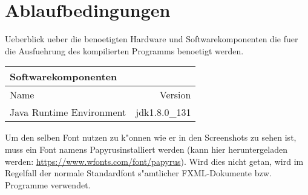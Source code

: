 \section{Ablaufbedingungen}
Ueberblick ueber die benoetigten Hardware und Softwarekomponenten die fuer die Ausfuehrung des kompilierten Programms benoetigt werden. 

\begin{table}[h!]
	\begin{tabular}{lr} 
	\toprule
	Softwarekomponenten\\  
	\midrule 
	Name & Version\\ 
	\midrule 
	Java Runtime Environment & jdk1.8.0\_131\\ 
	\bottomrule
	\end{tabular}
	\label{tab:ablaufbedingungen}
\end{table}

Um den selben Font nutzen zu k"onnen wie er in den Screenshots zu sehen ist, muss ein Font namens \glqq Papyrus\grqq installiert werden (kann hier heruntergeladen werden: \url{https://www.wfonts.com/font/papyrus}). Wird dies nicht getan, wird im Regelfall der normale Standardfont s"amtlicher FXML-Dokumente bzw. Programme verwendet. 
